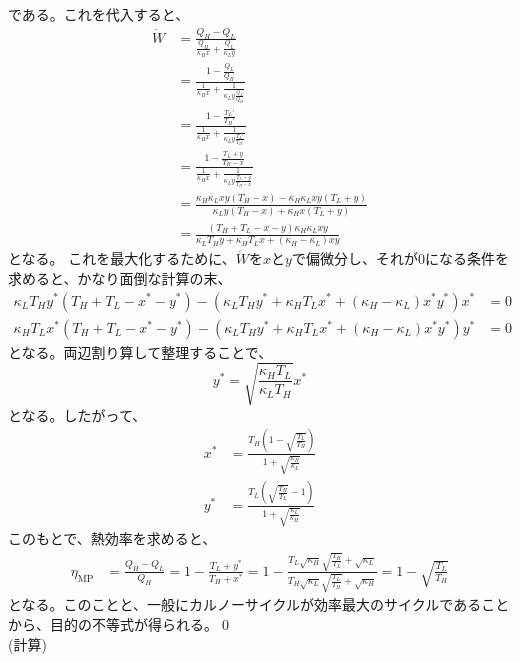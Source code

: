 \documentclass[a4paper,10.5pt]{jsarticle}
\numberwithin{equation}{section}
\begin{document}
である。これを代入すると、
\begin{align}
  \dot{W} &= \frac{Q_{H} - Q_{L}}{\frac{Q_{H}}{\kappa_{H}x} + \frac{Q_{L}}{\kappa_{L}y}}\\
  &= \frac{1-\frac{Q_{L}}{Q_{H}}}{\frac{1}{\kappa_{H}x} + \frac{1}{\kappa_{L}y\frac{Q_{L}}{Q_{H}}}}\\
  &= \frac{1-\frac{T_{L}'}{T_{H}'}}{\frac{1}{\kappa_{H}x} + \frac{1}{\kappa_{L}y\frac{T_{L}'}{T_{H}'}}}\\
  &= \frac{1-\frac{T_{L}+y}{T_{H}-x}}{\frac{1}{\kappa_{H}x} + \frac{1}{\kappa_{L}y\frac{T_{L}+y}{T_{H}-x}}}\\
  &= \frac{\kappa_{H}\kappa_{L}xy(T_{H}-x)-\kappa_{H}\kappa_{L}xy(T_{L}+y)}{\kappa_{L}y(T_{H}-x)+\kappa_{H}x(T_{L}+y)}\\
  &= \frac{(T_H + T_L - x - y)\kappa_H \kappa_L xy}{\kappa_L T_H y + \kappa_H T_L x + (\kappa_H - \kappa_L) xy}
\end{align}
となる。
これを最大化するために、$\dot{W}$を$x$と$y$で偏微分し、それが0になる条件を求めると、かなり面倒な計算の末、
\begin{align}
  \kappa_L T_H y^*(T_H + T_L - x^* - y^*) - (\kappa_L T_H y^* + \kappa_H T_L x^* + (\kappa_H - \kappa_L) x^* y^*) x^* &= 0\\
  \kappa_H T_L x^*(T_H + T_L - x^* - y^*) - (\kappa_L T_H y^* + \kappa_H T_L x^* + (\kappa_H - \kappa_L) x^* y^*) y^* &= 0
\end{align}
となる。両辺割り算して整理することで、
\begin{equation}
  y^* = \sqrt{\frac{\kappa_H T_L}{\kappa_L T_H}}x^*
\end{equation}
となる。したがって、
\begin{align}
  x^* &= \frac{T_H \left(1 - \sqrt{\frac{T_L}{T_H}} \right)}{1 + \sqrt{\frac{\kappa_H}{\kappa_L}}}\\
  y^* &= \frac{T_L \left(\sqrt{\frac{T_H}{T_L}} - 1\right)}{1 + \sqrt{\frac{\kappa_L}{\kappa_H}}}
\end{align}
このもとで、熱効率を求めると、
\begin{align}
  \eta_{\text{MP}} &= \frac{Q_H - Q_L}{Q_H} = 1 - \frac{T_L + y^*}{T_H + x^*} = 1 - \frac{T_L \sqrt{\kappa_H} \sqrt{\frac{T_H}{T_L}} + \sqrt{\kappa_L}}{T_H \sqrt{\kappa_L} \sqrt{\frac{T_L}{T_H}} + \sqrt{\kappa_H}} = 1 - \sqrt{\frac{T_L}{T_H}}
\end{align}
となる。このことと、一般にカルノーサイクルが効率最大のサイクルであることから、目的の不等式が得られる。\qed\\
(計算)\\
\end{document}
